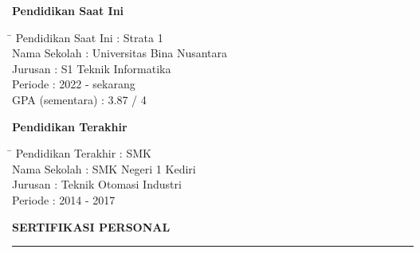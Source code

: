 \documentclass[12pt,a4paper]{article}
\begin{document}
\textbf{Pendidikan Saat Ini}
\begin{tabbing}
\hspace{4cm} \= \hspace{10cm} \kill
Pendidikan Saat Ini \> : Strata 1 \\
Nama Sekolah \> : Universitas Bina Nusantara \\
Jurusan \> : S1 Teknik Informatika \\
Periode \> : 2022 - sekarang \\
GPA (sementara) \> : 3.87 / 4 \\
\end{tabbing}

\vspace{0.3cm}

\textbf{Pendidikan Terakhir}
\begin{tabbing}
\hspace{4cm} \= \hspace{10cm} \kill
Pendidikan Terakhir \> : SMK \\
Nama Sekolah \> : SMK Negeri 1 Kediri  \\
Jurusan \> : Teknik Otomasi Industri \\
Periode \> : 2014 - 2017 \\
\end{tabbing}






\vspace{0.5cm}
\textbf{SERTIFIKASI PERSONAL}
\vspace{0.2cm}
\hrule
\vspace{0.4cm}
\end{document}
